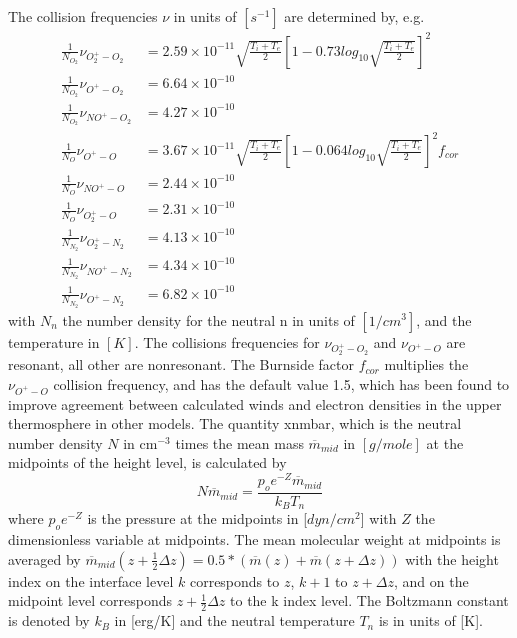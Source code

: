 %
The collision frequencies $\nu$ in units of $[s^{-1}]$ are
determined by, e.g. \cite{Schunk00}
%
\begin{align}
 \frac{1}{N_{O_2}} \nu_{O_2^+ - O_2} &= 2.59\times 10^{-11}\sqrt{\frac{T_i +
 T_e}{2}}\left[ 1-0.73 log_{10}\sqrt{\frac{T_i +
 T_e}{2}}\right]^2  \\
\frac{1}{N_{O_2}} \nu_{O^+ - O_2}  &=6.64\times 10^{-10}  \\
\frac{1}{N_{O_2}} \nu_{NO^+ - O_2} &=4.27\times 10^{-10}  \\
\frac{1}{N_{O}} \nu_{O^+ - O}      &=3.67\times
10^{-11}\sqrt{\frac{T_i + T_e}{2}}[ 1- 
  0.064 log_{10}\sqrt{\frac{T_i +T_e}{2}}]^2  f_{cor}  \\
\frac{1}{N_{O}} \nu_{NO^+ - O}    &=2.44\times 10^{-10}  \\
\frac{1}{N_{O}} \nu_{O_2^+ - O}   &=2.31\times 10^{-10}  \\
\frac{1}{N_{N_2}} \nu_{O_2^+ - N_2}&=4.13\times 10^{-10} \\
\frac{1}{N_{N_2}} \nu_{NO^+ - N_2} &=4.34\times 10^{-10} \\
\frac{1}{N_{N_2}} \nu_{O^+ - N_2}  &=6.82\times 10^{-10}
\end{align}
%
with $N_n$ the number density for the neutral n in units of
$[1/cm^3]$, and the temperature in $[K]$. The collisions frequencies
for $\nu_{O_2^+ - O_2}$ and $\nu_{O^+ - O}$ are resonant, all other
are nonresonant. The Burnside factor $f_{cor}$
multiplies the $\nu_{O^+ - O}$ collision frequency, and has the default
value 1.5, which has been found to improve agreement between
calculated winds and electron densities in the upper thermosphere in
other models. The 
quantity xnmbar, which is the neutral number density $N$ in cm$^{-3}$ times the
mean mass $ \overline{m}_{mid} $ in $[g/mole]$ at
the midpoints of the height level, is calculated by
%
\begin{equation}
  N \overline{m}_{mid} = \frac{p_o e^{-Z} \overline{m}_{mid}}{k_B T_n}
\end{equation}
%
where $p_o e^{-Z}$
is the pressure at the midpoints in [$ dyn/cm^2 $] with $Z$ the
dimensionless variable at midpoints. The mean molecular weight at
midpoints is averaged by $\overline{m}_{mid}(z + \frac{1}{2} \Delta
z)= 0.5*(\overline{m}(z)+\overline{m}(z + \Delta z))$ with the
height index on the interface level $k$ corresponds to $z$, $k+1$ to
$z+ \Delta z$, and on the midpoint level corresponds $z +
\frac{1}{2} \Delta z$ to the k index level. The Boltzmann constant
is denoted by $k_B$ in [erg/K] and the neutral temperature
$T_n$ is in units of [K]. \\

